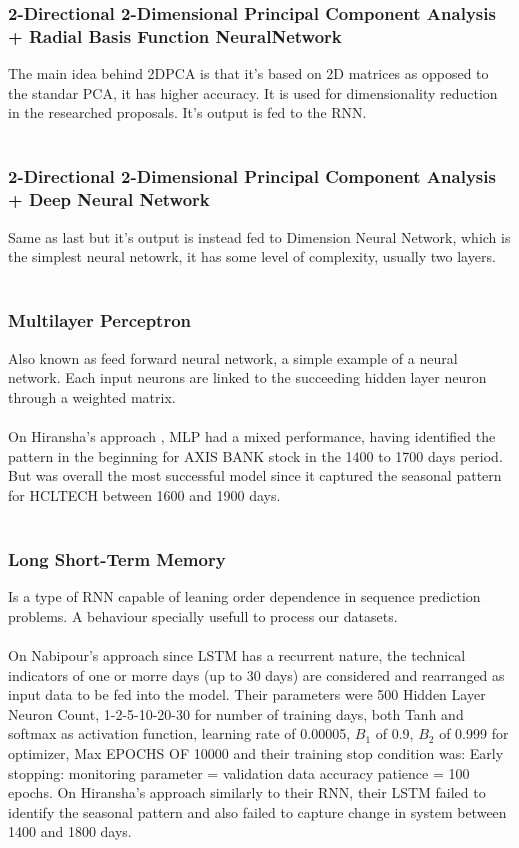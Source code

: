 \documentclass[conference]{IEEEtran}
\begin{document}
\subsubsection{2-Directional 2-Dimensional Principal Component Analysis + Radial Basis Function NeuralNetwork}
The main idea behind 2DPCA is that it's based on 2D matrices as opposed to the standar PCA, it has higher accuracy. It is used for dimensionality reduction in
the researched proposals. It's output is fed to the RNN.
\\\\
\subsubsection{2-Directional 2-Dimensional Principal Component Analysis + Deep Neural Network}
Same as last but it's output is instead fed to Dimension Neural Network, which is the simplest neural netowrk, it has some level of complexity, usually two layers.
\\\\
\subsubsection{Multilayer Perceptron}
Also known as feed forward neural network, a simple example of a neural network. Each input neurons are linked to the succeeding hidden layer neuron
through a weighted matrix.
\\\\
On Hiransha's approach \cite{M2018}, MLP had a mixed performance, having identified the pattern in the beginning for AXIS BANK stock in the 1400 to 1700 days period. But was overall the most successful model since it captured the seasonal pattern for HCLTECH between 1600 and 1900 days.
\\\\
\subsubsection{Long Short-Term Memory}
Is a type of RNN capable of leaning order dependence in sequence prediction problems. A behaviour specially usefull to process our datasets. 
\\\\
On Nabipour's approach \cite{nabipour2020predicting} since LSTM has a recurrent nature, the technical indicators of one or morre days (up to 30 days) are considered and rearranged as input data to be fed into the model. Their parameters were 500 Hidden Layer Neuron Count, 1-2-5-10-20-30 for number of training days, both Tanh and softmax as activation function, learning rate of 0.00005, $B_1$ of 0.9, $B_2$ of 0.999 for optimizer, Max EPOCHS OF 10000 and their training stop condition
was: Early stopping: monitoring parameter = validation data accuracy patience = 100 epochs.
On Hiransha's approach \cite{M2018} similarly to their RNN, their LSTM failed to identify the seasonal pattern and also failed to capture change in system between 1400 and 1800 days.
\\\\
\end{document}
